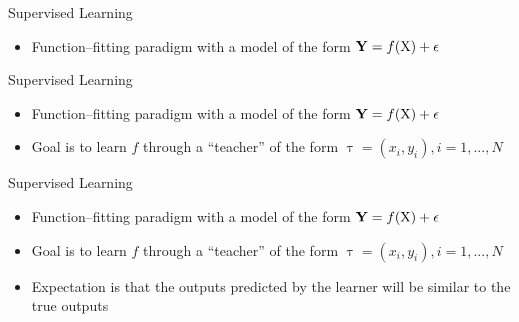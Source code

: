 \begin{frame}{Supervised Learning}
    \begin{itemize}
        \item Function--fitting paradigm with a model of the form $\boldsymbol{\mathbf{Y}} = f(\text{X}) + \epsilon$
    \end{itemize}
\end{frame}

\begin{frame}{Supervised Learning}
    \begin{itemize}
        \item Function--fitting paradigm with a model of the form $\boldsymbol{\mathbf{Y}} = f(\text{X}) + \epsilon$
        \item Goal is to learn $f$ through a ``teacher'' of the form $\uptau = (x_i, y_i), i = 1,..., N$ \cite{book:esl}
    \end{itemize}
\end{frame}

\begin{frame}{Supervised Learning}
    \begin{itemize}
        \item Function--fitting paradigm with a model of the form $\boldsymbol{\mathbf{Y}} = f(\text{X}) + \epsilon$
        \item Goal is to learn $f$ through a ``teacher'' of the form $\uptau = (x_i, y_i), i = 1,..., N$ \cite{book:esl}
        \item Expectation is that the outputs predicted by the learner will be similar to the true outputs
    \end{itemize}
\end{frame}